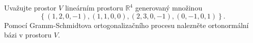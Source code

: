 Uvažujte prostor $V$ lineárním prostoru $\mathbb{R} ^{4}$ generovaný množinou
$$\left \{ \left ( 1,2,0,-1 \right ),\left ( 1,1,0,0 \right ),\left ( 2,3,0,-1
\right ),\left (0,-1,0,1  \right ) \right \}.$$ Pomocí Gramm-Schmidtova
ortogonalizačního procesu nalezněte ortonormální bázi v prostoru $V$.
